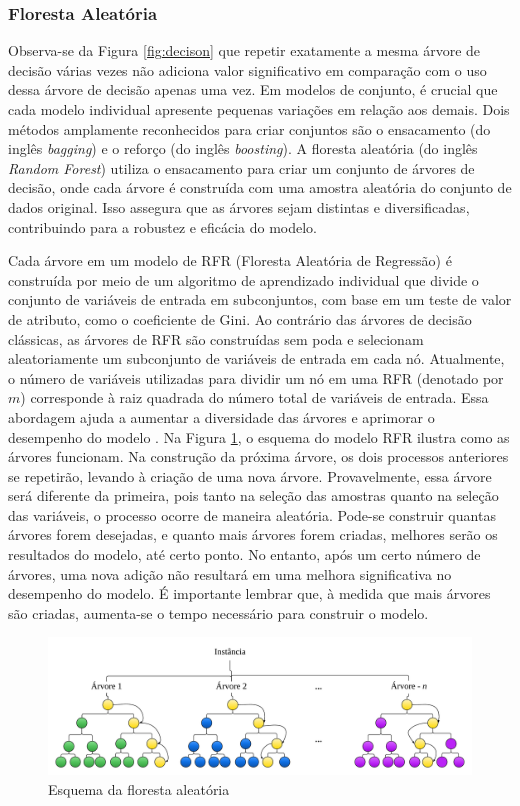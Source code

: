 \subsubsection{Floresta Aleat\'oria } \label{subsubsec:rf}

Observa-se da Figura \ref{fig:decison} que repetir exatamente a mesma árvore de decisão várias vezes não adiciona valor significativo em comparação com o uso dessa árvore de decisão apenas uma vez. Em modelos de conjunto, é crucial que cada modelo individual apresente pequenas variações em relação aos demais. Dois métodos amplamente reconhecidos para criar conjuntos são o ensacamento (do inglês \textit{bagging}) e o reforço (do inglês \textit{boosting}). A floresta aleatória (do inglês \textit{Random Forest}) utiliza o ensacamento para criar um conjunto de árvores de decisão, onde cada árvore é construída com uma amostra aleatória do conjunto de dados original. Isso assegura que as árvores sejam distintas e diversificadas, contribuindo para a robustez e eficácia do modelo.

Cada árvore em um modelo de RFR (Floresta Aleatória de Regressão)  é construída por meio de um algoritmo de aprendizado individual que divide o conjunto de variáveis de entrada em subconjuntos, com base em um teste de valor de atributo, como o coeficiente de Gini. Ao contrário das árvores de decisão clássicas, as árvores de RFR são construídas sem poda e selecionam aleatoriamente um subconjunto de variáveis de entrada em cada nó. Atualmente, o número de variáveis utilizadas para dividir um nó em uma RFR (denotado por $m$) corresponde à raiz quadrada do número total de variáveis de entrada. Essa abordagem ajuda a aumentar a diversidade das árvores e aprimorar o desempenho do modelo \cite{Pelletier2016156}. Na Figura \ref{fig:rf}, o esquema do modelo RFR ilustra como as árvores funcionam.
Na construção da próxima árvore, os dois processos anteriores se repetirão, levando à criação de uma nova árvore. Provavelmente, essa árvore será diferente da primeira, pois tanto na seleção das amostras quanto na seleção das variáveis, o processo ocorre de maneira aleatória.
Pode-se construir quantas árvores forem desejadas, e quanto mais árvores forem criadas, melhores serão os resultados do modelo, até certo ponto. No entanto, após um certo número de árvores, uma nova adição não resultará em uma melhora significativa no desempenho do modelo.
É importante lembrar que, à medida que mais árvores são criadas, aumenta-se o tempo necessário para construir o modelo.

\begin{figure}[H]
	\centering
	\caption{Esquema da floresta aleatória}
	\label{fig:rf}
	\includegraphics[width=\linewidth]{Modelos/Figuras/RF}
	

\end{figure}


